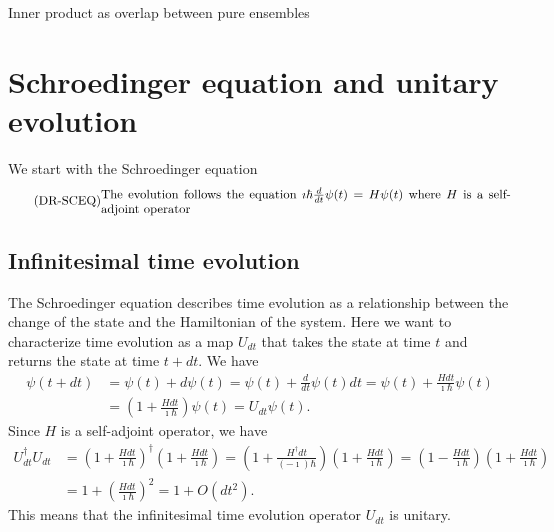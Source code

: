 Inner product as overlap between pure ensembles

\section{Schroedinger equation and unitary evolution}

We start with the Schroedinger equation
\begin{equation}\label{rp-qm-uev-condSchroedingerEq}
	\tag{DR-SCEQ}
	\eqtext{The evolution follows the equation $\imath \hbar \frac{d}{dt} \psi(t) = H \psi(t)$ where $H$ is a self-adjoint operator}
\end{equation}

\subsection{Infinitesimal time evolution}

The Schroedinger equation describes time evolution as a relationship between the change of the state and the Hamiltonian of the system. Here we want to characterize time evolution as a map $U_{dt}$ that takes the state at time $t$ and returns the state at time $t + dt$. We have
\begin{equation}
	\begin{aligned}
		\psi(t+dt) &= \psi(t) + d\psi(t) = \psi(t) + \frac{d}{dt} \psi(t) dt = \psi(t)+ \frac{H dt}{\imath \hbar} \psi(t)\\
		&= \left(1 + \frac{H dt}{\imath \hbar}\right)\psi(t) = U_{dt}\psi(t).
	\end{aligned}
\end{equation}
Since $H$ is a self-adjoint operator, we have
\begin{equation}
	\begin{aligned}
		U_{dt}^\dagger U_{dt} &= \left(1 + \frac{H dt}{\imath \hbar}\right)^\dagger \left(1 + \frac{H dt}{\imath \hbar}\right) = \left(1 + \frac{H^\dagger dt}{(- \imath) \hbar}\right) \left(1 + \frac{H dt}{\imath \hbar}\right) = \left(1 - \frac{H dt}{\imath \hbar}\right) \left(1 + \frac{H dt}{\imath \hbar}\right) \\
		&= 1 + \left(\frac{H dt}{\imath \hbar}\right)^2 = 1 + O(dt^2).
	\end{aligned}
\end{equation}
This means that the infinitesimal time evolution operator $U_{dt}$ is unitary.

